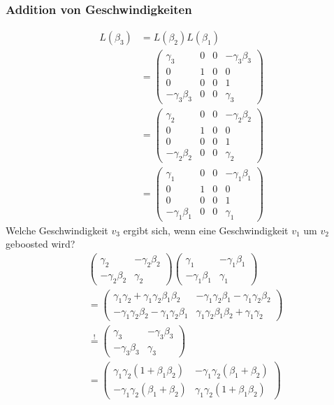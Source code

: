 \documentclass[oneside]{book}
\theoremstyle{definition}
\begin{document}
\subsubsection{Addition von Geschwindigkeiten}
\begin{align*}
L(\beta_3) &= L(\beta_2) L(\beta_1)\\
&=\begin{pmatrix}
\gamma_3 & 0 & 0 &- \gamma_3 \beta_3\\
0 & 1 & 0 & 0\\
0 & 0 & 0 & 1\\
- \gamma_3 \beta_3 & 0 & 0 & \gamma_3
\end{pmatrix}\\
&= \begin{pmatrix}
	\gamma_2 & 0 & 0 &- \gamma_2 \beta_2\\
	0 & 1 & 0 & 0\\
	0 & 0 & 0 & 1\\
	- \gamma_2 \beta_2 & 0 & 0 & \gamma_2
\end{pmatrix}\\
&= \begin{pmatrix}
	\gamma_1 & 0 & 0 &- \gamma_1 \beta_1\\
	0 & 1 & 0 & 0\\
	0 & 0 & 0 & 1\\
	- \gamma_1 \beta_1 & 0 & 0 & \gamma_1
\end{pmatrix}
\end{align*}
Welche Geschwindigkeit $v_3$ ergibt sich, wenn eine Geschwindigkeit $v_1$ um $v_2$ geboosted wird?
\begin{align*}
&\begin{pmatrix}
	\gamma_2 & -\gamma_2 \beta_2\\
	- \gamma_2 \beta_2 & \gamma_2
\end{pmatrix} \begin{pmatrix}
\gamma_1 & - \gamma_1 \beta_1\\
-\gamma_1 \beta_1 & \gamma_1
\end{pmatrix}\\
&= \begin{pmatrix}
\gamma_1 \gamma_2 + \gamma_1 \gamma_2 \beta_1 \beta_2 & - \gamma_1 \gamma_2 \beta_1 - \gamma_1 \gamma_2 \beta_2\\
- \gamma_1 \gamma_2 \beta_2 - \gamma_1 \gamma_2 \beta_1 & \gamma_1 \gamma_2 \beta_1 \beta_2 + \gamma_1 \gamma_2
\end{pmatrix}\\
&\overset{!}{=} \begin{pmatrix}
\gamma_3 & -\gamma_3 \beta_3\\
- \gamma_3 \beta_3 & \gamma_3
\end{pmatrix}\\
&= \begin{pmatrix}
\gamma_1 \gamma_2 (1 + \beta_1 \beta_2) & - \gamma_1 \gamma_2 (\beta_1 + \beta_2)\\
- \gamma_1 \gamma_2 (\beta_1 + \beta_2) & \gamma_1 \gamma_2 (1 + \beta_1 \beta_2)
\end{pmatrix}
\end{align*}
\end{document}
